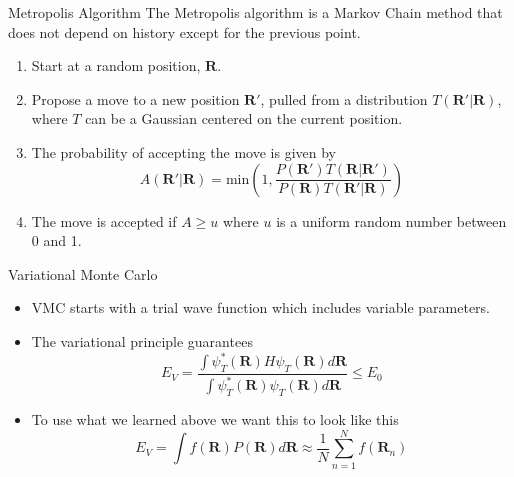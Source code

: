 \documentclass{beamer}
\newcommand{\R}{\mathbf{R}}
\begin{document}
\begin{frame}{Metropolis Algorithm}
   The Metropolis algorithm is a Markov Chain method that does not depend on history except for the previous point.
\begin{enumerate}
   \item Start at a random position, $\R$.
   \item Propose a move to a new position $\R'$, pulled from a distribution $T(\R'|\R)$, where $T$ can be a Gaussian centered on the current position. %
   \item The probability of accepting the move is given by
   \begin{equation*}
      A(\R'|\R) = \mathrm{min}\left(1,\frac{P(\R')T(\R|\R')}{P(\R)T(\R'|\R)}\right)
   \end{equation*}
   \item The move is accepted if $A\ge u$ where $u$ is a uniform random number between 0 and 1.
\end{enumerate}
\end{frame}

\begin{frame}{Variational Monte Carlo}
\begin{itemize}
   \item VMC starts with a trial wave function which includes variable parameters.
   \item The variational principle guarantees
   \begin{equation*}
      E_V = \frac{\int\psi_T^*(\R)H\psi_T(\R)d\R}{\int\psi_T^*(\R)\psi_T(\R)d\R} \le E_0
   \end{equation*}
   \item To use what we learned above we want this to look like this
   \begin{equation*}
      E_V = \int f(\R)P(\R) d\R \approx \frac{1}{N}\sum\limits_{n=1}^N f(\R_n)
   \end{equation*}
\end{itemize}
\end{frame}
\end{document}
